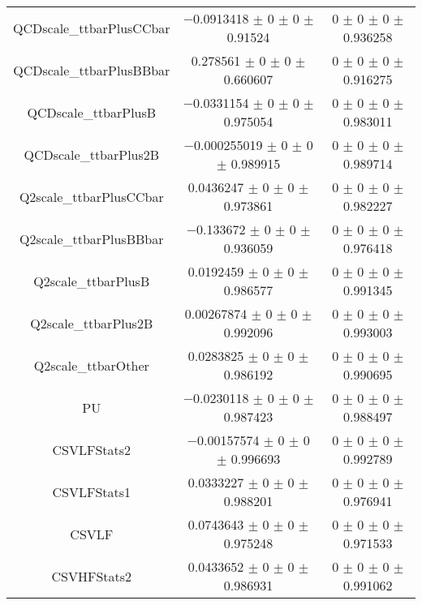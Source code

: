 \begin{table}
\begin{tabular}{ccc}
QCDscale\_ttbarPlusCCbar 	& \num{-0.0913418} $\pm$ \num{0} $\pm$ \num{0} $\pm$ \num{0.91524} 	& \num{0} $\pm$ \num{0} $\pm$ \num{0} $\pm$ \num{0.936258}\\
QCDscale\_ttbarPlusBBbar 	& \num{0.278561} $\pm$ \num{0} $\pm$ \num{0} $\pm$ \num{0.660607} 	& \num{0} $\pm$ \num{0} $\pm$ \num{0} $\pm$ \num{0.916275}\\
QCDscale\_ttbarPlusB 	& \num{-0.0331154} $\pm$ \num{0} $\pm$ \num{0} $\pm$ \num{0.975054} 	& \num{0} $\pm$ \num{0} $\pm$ \num{0} $\pm$ \num{0.983011}\\
QCDscale\_ttbarPlus2B 	& \num{-0.000255019} $\pm$ \num{0} $\pm$ \num{0} $\pm$ \num{0.989915} 	& \num{0} $\pm$ \num{0} $\pm$ \num{0} $\pm$ \num{0.989714}\\
Q2scale\_ttbarPlusCCbar 	& \num{0.0436247} $\pm$ \num{0} $\pm$ \num{0} $\pm$ \num{0.973861} 	& \num{0} $\pm$ \num{0} $\pm$ \num{0} $\pm$ \num{0.982227}\\
Q2scale\_ttbarPlusBBbar 	& \num{-0.133672} $\pm$ \num{0} $\pm$ \num{0} $\pm$ \num{0.936059} 	& \num{0} $\pm$ \num{0} $\pm$ \num{0} $\pm$ \num{0.976418}\\
Q2scale\_ttbarPlusB 	& \num{0.0192459} $\pm$ \num{0} $\pm$ \num{0} $\pm$ \num{0.986577} 	& \num{0} $\pm$ \num{0} $\pm$ \num{0} $\pm$ \num{0.991345}\\
Q2scale\_ttbarPlus2B 	& \num{0.00267874} $\pm$ \num{0} $\pm$ \num{0} $\pm$ \num{0.992096} 	& \num{0} $\pm$ \num{0} $\pm$ \num{0} $\pm$ \num{0.993003}\\
Q2scale\_ttbarOther 	& \num{0.0283825} $\pm$ \num{0} $\pm$ \num{0} $\pm$ \num{0.986192} 	& \num{0} $\pm$ \num{0} $\pm$ \num{0} $\pm$ \num{0.990695}\\
PU 	& \num{-0.0230118} $\pm$ \num{0} $\pm$ \num{0} $\pm$ \num{0.987423} 	& \num{0} $\pm$ \num{0} $\pm$ \num{0} $\pm$ \num{0.988497}\\
CSVLFStats2 	& \num{-0.00157574} $\pm$ \num{0} $\pm$ \num{0} $\pm$ \num{0.996693} 	& \num{0} $\pm$ \num{0} $\pm$ \num{0} $\pm$ \num{0.992789}\\
CSVLFStats1 	& \num{0.0333227} $\pm$ \num{0} $\pm$ \num{0} $\pm$ \num{0.988201} 	& \num{0} $\pm$ \num{0} $\pm$ \num{0} $\pm$ \num{0.976941}\\
CSVLF 	& \num{0.0743643} $\pm$ \num{0} $\pm$ \num{0} $\pm$ \num{0.975248} 	& \num{0} $\pm$ \num{0} $\pm$ \num{0} $\pm$ \num{0.971533}\\
CSVHFStats2 	& \num{0.0433652} $\pm$ \num{0} $\pm$ \num{0} $\pm$ \num{0.986931} 	& \num{0} $\pm$ \num{0} $\pm$ \num{0} $\pm$ \num{0.991062}\\

\end{tabular}
\end{table}
